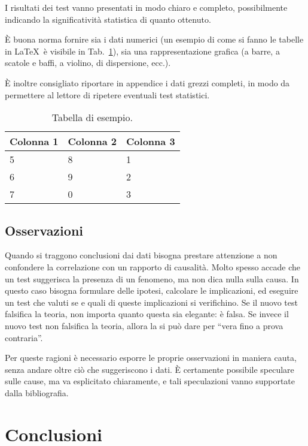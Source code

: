 \documentclass[12pt]{report}
\begin{document}
I risultati dei test vanno presentati in modo chiaro e completo, possibilmente indicando la significatività statistica di quanto ottenuto.

\`E buona norma fornire sia i dati numerici (un esempio di come si fanno le tabelle in \LaTeX\  è visibile in Tab.\ \ref{tab:sample}), sia una rappresentazione grafica (a barre, a scatole e baffi, a violino, di dispersione, ecc.).

\`E inoltre consigliato riportare in appendice i dati grezzi completi, in modo da permettere al lettore di ripetere eventuali test statistici.

\begin{table}
	\centering
    \begin{tabular}{|l|l|l|}
	\hline
	Colonna 1 & Colonna 2 & Colonna 3 \\ \hline
	5         & 8         & 1         \\
	6         & 9         & 2         \\
	7         & 0         & 3         \\ \hline
\end{tabular}
	\caption{Tabella di esempio.}
	\label{tab:sample}
\end{table}

\section{Osservazioni}

Quando si traggono conclusioni dai dati bisogna prestare attenzione a non confondere la correlazione con un rapporto di causalità. Molto spesso accade che un test suggerisca la presenza di un fenomeno, ma non dica nulla sulla causa. In questo caso bisogna formulare delle ipotesi, calcolare le implicazioni, ed eseguire un test che valuti se e quali di queste implicazioni si verifichino. Se il nuovo test falsifica la teoria, non importa quanto questa sia elegante: è falsa. Se invece il nuovo test non falsifica la teoria, allora la si può dare per ``vera fino a prova contraria''.

Per queste ragioni è necessario esporre le proprie osservazioni in maniera cauta, senza andare oltre ciò che suggeriscono i dati. \`E certamente possibile speculare sulle cause, ma va esplicitato chiaramente, e tali speculazioni vanno supportate dalla bibliografia.

% 
% 

\chapter{Conclusioni}
\label{cap6}
\end{document}
